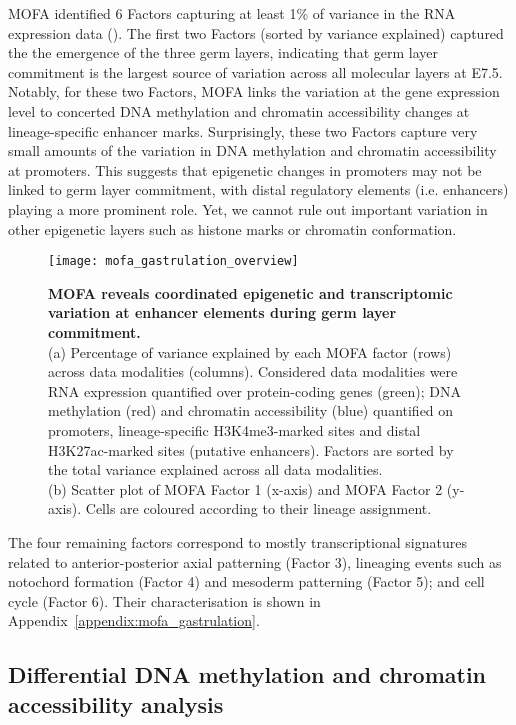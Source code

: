 MOFA identified 6 Factors capturing at least 1\% of variance in the RNA expression data (). The first two Factors (sorted by variance explained) captured the the emergence of the three germ layers, indicating that germ layer commitment is the largest source of variation across all molecular layers at E7.5. Notably, for these two Factors, MOFA links the variation at the gene expression level to concerted DNA methylation and chromatin accessibility changes at lineage-specific enhancer marks. Surprisingly, these two Factors capture very small amounts of the variation in DNA methylation and chromatin accessibility at promoters. This suggests that epigenetic changes in promoters may not be linked to germ layer commitment, with distal regulatory elements (i.e. enhancers) playing a more prominent role. Yet, we cannot rule out important variation in other epigenetic layers such as histone marks or chromatin conformation.

\begin{figure}[H]
	\centering
	\texttt{[image: mofa\_gastrulation\_overview]}
	\caption[]{
	\textbf{MOFA reveals coordinated epigenetic and transcriptomic variation at enhancer elements during germ layer commitment.} \\
	(a) Percentage of variance explained by each MOFA factor (rows) across data modalities (columns). Considered data modalities were RNA expression quantified over protein-coding genes (green); DNA methylation (red) and chromatin accessibility (blue) quantified on promoters, lineage-specific H3K4me3-marked sites and distal H3K27ac-marked sites (putative enhancers). Factors are sorted by the total variance explained across all data modalities. \\
	(b) Scatter plot of MOFA Factor 1 (x-axis) and MOFA Factor 2 (y-axis). Cells are coloured according to their lineage assignment.
	}
	\label{fig:mofa_gastrulation_overview}
\end{figure}

The four remaining factors correspond to mostly transcriptional signatures related to anterior-posterior axial patterning (Factor 3), lineaging events such as notochord formation (Factor 4) and mesoderm patterning (Factor 5); and cell cycle (Factor 6). Their characterisation is shown in Appendix~\ref{appendix:mofa_gastrulation}.

\subsection{Differential DNA methylation and chromatin accessibility analysis}

